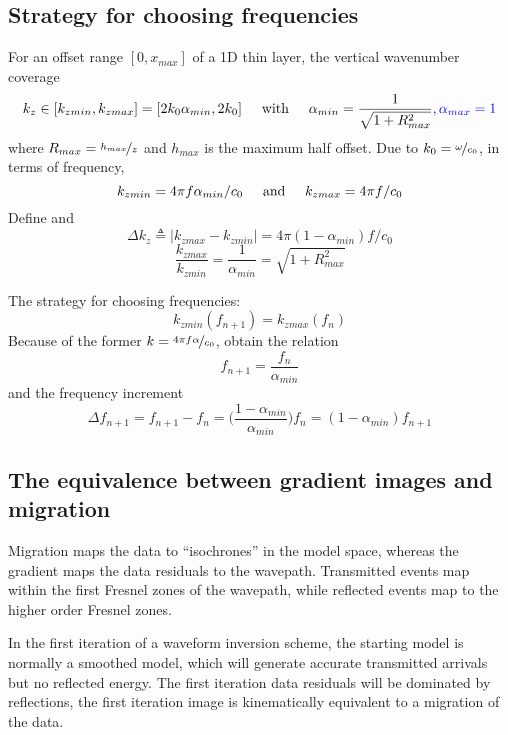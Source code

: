 \subsection{Strategy for choosing frequencies}
For an offset range $[0,x_{max}]$ of a 1D thin layer, the vertical wavenumber coverage
\[ k_z\in[k_{zmin},k_{zmax}]=[2k_0\alpha_{min},2k_0] \text{\hspace{5mm}with\hspace{5mm}} \alpha_{min}=\frac{1}{\sqrt{1+R_{max}^2}}{\color{blue},\alpha_{max}=1} \]
where $R_{max}=\nicefrac{h_{max}}{z}$ and $h_{max}$ is the maximum half offset.
Due to $k_0=\nicefrac{\omega}{c_0}$, in terms of frequency,
\[ k_{zmin}=4\pi f\alpha_{min}/c_0 \text{\hspace{5mm}and\hspace{5mm}} k_{zmax}=4\pi f/c_0 \]
Define  and 
\[ \Delta k_z\triangleq|k_{zmax}-k_{zmin}|=4\pi(1-\alpha_{min})f/c_0 \]
\[ \frac{k_{zmax}}{k_{zmin}}=\frac{1}{\alpha_{min}}=\sqrt{1+R_{max}^2} \]

The strategy for choosing frequencies:
\[ k_{zmin}(f_{n+1})=k_{zmax}(f_n) \]
Because of the former $k=\nicefrac{4\pi f\alpha}{c_0}$, obtain the relation
\[ f_{n+1}=\frac{f_n}{\alpha_{min}} \]
and the frequency increment
\[ \Delta f_{n+1}=f_{n+1}-f_n=\Big(\frac{1-\alpha_{min}}{\alpha_{min}}\Big)f_n=(1-\alpha_{min})f_{n+1} \]

\subsection{The equivalence between gradient images and migration}
Migration maps the data to ``isochrones'' in the model space,
whereas the gradient maps the data residuals to the wavepath.
Transmitted events map within the first Fresnel zones of the wavepath,
while reflected events map to the higher order Fresnel zones.

In the first iteration of a waveform inversion scheme,
the starting model is normally a smoothed model,
which will generate accurate transmitted arrivals but no reflected energy.
The first iteration data residuals will be dominated by reflections,
the first iteration image is kinematically equivalent to a migration of the data.

